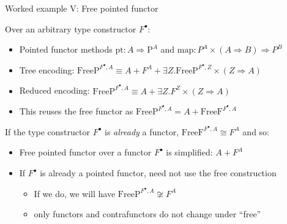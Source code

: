 \documentclass[english,,russian]{beamer}
\begin{document}
\begin{frame}{Worked example V: Free pointed functor}

Over an arbitrary type constructor $F^{\bullet}$:
\begin{itemize}
\item Pointed functor methods {\footnotesize{}$\text{pt}:A\Rightarrow\text{P}^{A}$}
and {\footnotesize{}$\text{map}:P^{A}\times\left(A\Rightarrow B\right)\Rightarrow P^{B}$}{\footnotesize\par}
\item Tree encoding: {\footnotesize{}$\text{FreeP}^{F^{\bullet},A}\equiv A+F^{A}+\exists Z.\text{FreeP}^{F^{\bullet},Z}\times\left(Z\Rightarrow A\right)$}{\footnotesize\par}
\item Reduced encoding: {\footnotesize{}$\text{FreeP}^{F^{\bullet},A}\equiv A+\exists Z.F^{Z}\times\left(Z\Rightarrow A\right)$}{\footnotesize\par}
\item This reuses the free functor as $\text{FreeP}^{F^{\bullet},A}=A+\text{FreeF}^{F^{\bullet},A}$
\end{itemize}
If the type constructor $F^{\bullet}$ is \emph{already} a functor,
$\text{FreeF}^{F^{\bullet},A}\cong F^{A}$ and so:
\begin{itemize}
\item Free pointed functor over a functor $F^{\bullet}$ is simplified:
$A+F^{A}$
\item If $F^{\bullet}$ is already a pointed functor, need not use the free
construction
\begin{itemize}
\item If we do, we will have $\text{FreeP}^{F^{\bullet},A}\not\cong F^{A}$ 
\item only functors and contrafunctors do not change under ``free''
\end{itemize}
\end{itemize}
\end{frame}
\end{document}
